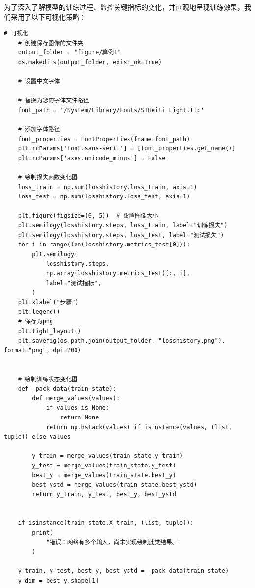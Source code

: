 \documentclass{Sichuan Normal University}
\begin{document}
为了深入了解模型的训练过程、监控关键指标的变化，并直观地呈现训练效果，我们采用了以下可视化策略：
\begin{lstlisting}[style=python,basicstyle=\footnotesize\fontspec{Courier New},]  
    # 可视化
    # 创建保存图像的文件夹
    output_folder = "figure/算例1"
    os.makedirs(output_folder, exist_ok=True)
    
    # 设置中文字体
    
    # 替换为您的字体文件路径
    font_path = '/System/Library/Fonts/STHeiti Light.ttc'
    
    # 添加字体路径
    font_properties = FontProperties(fname=font_path)
    plt.rcParams['font.sans-serif'] = [font_properties.get_name()]
    plt.rcParams['axes.unicode_minus'] = False
    
    # 绘制损失函数变化图
    loss_train = np.sum(losshistory.loss_train, axis=1)
    loss_test = np.sum(losshistory.loss_test, axis=1)
    
    plt.figure(figsize=(6, 5))  # 设置图像大小
    plt.semilogy(losshistory.steps, loss_train, label="训练损失")
    plt.semilogy(losshistory.steps, loss_test, label="测试损失")
    for i in range(len(losshistory.metrics_test[0])):
        plt.semilogy(
            losshistory.steps,
            np.array(losshistory.metrics_test)[:, i],
            label="测试指标",
        )
    plt.xlabel("步骤")
    plt.legend()
    # 保存为png
    plt.tight_layout()
    plt.savefig(os.path.join(output_folder, "losshistory.png"), format="png", dpi=200)
    
    
    # 绘制训练状态变化图
    def _pack_data(train_state):
        def merge_values(values):
            if values is None:
                return None
            return np.hstack(values) if isinstance(values, (list, tuple)) else values
    
        y_train = merge_values(train_state.y_train)
        y_test = merge_values(train_state.y_test)
        best_y = merge_values(train_state.best_y)
        best_ystd = merge_values(train_state.best_ystd)
        return y_train, y_test, best_y, best_ystd
    
    
    if isinstance(train_state.X_train, (list, tuple)):
        print(
            "错误：网络有多个输入，尚未实现绘制此类结果。"
        )
    
    y_train, y_test, best_y, best_ystd = _pack_data(train_state)
    y_dim = best_y.shape[1]
    

\end{lstlisting}
\end{document}
